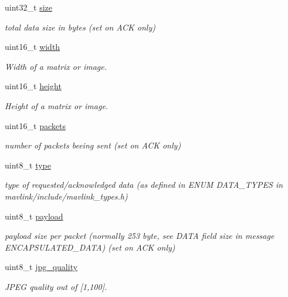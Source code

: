 \begin{DoxyCompactItemize}
\item 
uint32\+\_\+t \hyperlink{struct____mavlink__data__transmission__handshake__t_a56ed0b75c46c954e34311d97b5ade566}{size}
\begin{DoxyCompactList}\small\item\em total data size in bytes (set on A\+C\+K only) \end{DoxyCompactList}\item 
uint16\+\_\+t \hyperlink{struct____mavlink__data__transmission__handshake__t_a6550eca37edfa6254a10b0900ed591ac}{width}
\begin{DoxyCompactList}\small\item\em Width of a matrix or image. \end{DoxyCompactList}\item 
uint16\+\_\+t \hyperlink{struct____mavlink__data__transmission__handshake__t_affb5a0e1cc2b43b11a1e61eb794f50ea}{height}
\begin{DoxyCompactList}\small\item\em Height of a matrix or image. \end{DoxyCompactList}\item 
uint16\+\_\+t \hyperlink{struct____mavlink__data__transmission__handshake__t_ace3170e3ecd241c543c1aca1cabadcbf}{packets}
\begin{DoxyCompactList}\small\item\em number of packets beeing sent (set on A\+C\+K only) \end{DoxyCompactList}\item 
uint8\+\_\+t \hyperlink{struct____mavlink__data__transmission__handshake__t_aa9f6130e6e6de5cc36cf929f34eb9efa}{type}
\begin{DoxyCompactList}\small\item\em type of requested/acknowledged data (as defined in E\+N\+U\+M D\+A\+T\+A\+\_\+\+T\+Y\+P\+E\+S in mavlink/include/mavlink\+\_\+types.\+h) \end{DoxyCompactList}\item 
uint8\+\_\+t \hyperlink{struct____mavlink__data__transmission__handshake__t_aad2f91bab9dd0218b7077b3f26c58de8}{payload}
\begin{DoxyCompactList}\small\item\em payload size per packet (normally 253 byte, see D\+A\+T\+A field size in message E\+N\+C\+A\+P\+S\+U\+L\+A\+T\+E\+D\+\_\+\+D\+A\+T\+A) (set on A\+C\+K only) \end{DoxyCompactList}\item 
uint8\+\_\+t \hyperlink{struct____mavlink__data__transmission__handshake__t_adc3ee44ee1fccd48e2220fc5df1c9966}{jpg\+\_\+quality}
\begin{DoxyCompactList}\small\item\em J\+P\+E\+G quality out of \mbox{[}1,100\mbox{]}. \end{DoxyCompactList}\end{DoxyCompactItemize}


